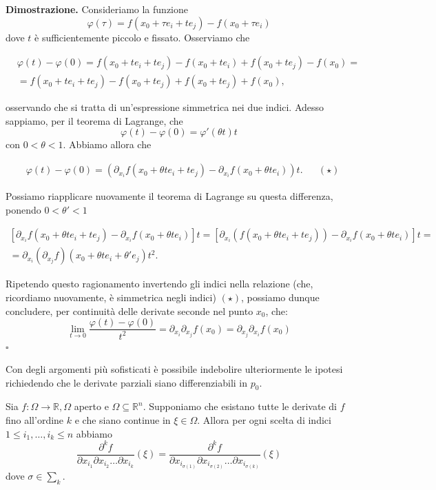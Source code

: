 \noindent \textbf{Dimostrazione. }
Consideriamo la funzione 
$$
\varphi(\tau) = f(x_0 + \tau e_i + t e_j) - f(x_0 + \tau e_i)
$$
dove $t$ è sufficientemente piccolo e fissato. Osserviamo che

\[\begin{aligned}
&\varphi(t) - \varphi(0) = f(x_0 + te_i + te_j) - f(x_0 + te_i) + f(x_0 + te_j) - f(x_0) = \\
&=f(x_0 + te_i + te_j) - f(x_0 + te_j) + f(x_0 + te_j) + f(x_0),
\end{aligned}\]

osservando che si tratta di un'espressione simmetrica nei due indici. Adesso sappiamo, per il teorema di Lagrange, che
$$
\varphi(t) - \varphi(0) = \varphi'(\theta t)t
$$
con $0 < \theta < 1$. Abbiamo allora che 

\[\begin{aligned}
&\varphi(t) - \varphi(0) = (\partial_{x_i} f(x_0 + \theta te_i + te_j) - \partial_{x_i} f(x_0 + \theta te_i))t. & &(\star)
\end{aligned}\]

Possiamo riapplicare nuovamente il teorema di Lagrange su questa differenza, ponendo $0 < \theta' < 1$

\[\begin{aligned}
[\partial_{x_i} f(x_0 + \theta te_i + te_j) - \partial_{x_i} f(x_0 + \theta te_i)]t = [\partial_{x_i} (f(x_0 + \theta te_i + te_j)) - \partial_{x_i} f(x_0 + \theta te_i)]t = \\
=\partial_{x_i} (\partial_{x_j} f) (x_0 + \theta t e_i + \theta' e_j)t^2.
\end{aligned}\]

Ripetendo questo ragionamento invertendo gli indici nella relazione (che, ricordiamo nuovamente, è simmetrica negli indici) $(\star)$, possiamo dunque concludere, per continuità delle derivate seconde nel punto $x_0$, che:
$$
\lim_{t \to 0} \frac{\varphi(t) - \varphi(0)}{t^2} = \partial_{x_i} \partial_{x_j} f(x_0) = \partial_{x_j} \partial_{x_i} f(x_0)
$$
\hfill $\square$

\begin{remark}
Con degli argomenti più sofisticati è possibile indebolire ulteriormente le ipotesi richiedendo che le derivate parziali siano differenziabili in $p_0$.
\end{remark}

\vspace{0.5cm}
\begin{theorem}[\textcolor{blue}{di Schwarz di ordine superiore}]
Sia $f: \Omega \to \mathbb{R}, \Omega$ aperto e $\Omega \subseteq \mathbb{R}^n$. Supponiamo che esistano tutte le derivate di $f$ fino all'ordine $k$ e che siano continue in $\xi \in \Omega$. Allora per ogni scelta di indici $1 \leq i_1, \ldots, i_k \leq n$ abbiamo
$$
\frac{\partial^k f}{\partial x_{i_1} \partial x_{i_2} \ldots \partial x_{i_k}}(\xi) = \frac{\partial^k f}{\partial x_{i_{\sigma(1)}} \partial x_{i_{\sigma(2)}} \ldots \partial x_{i_{\sigma(k)}}}(\xi)
$$
dove $\sigma \in \sum_{k}$.
\end{theorem}

